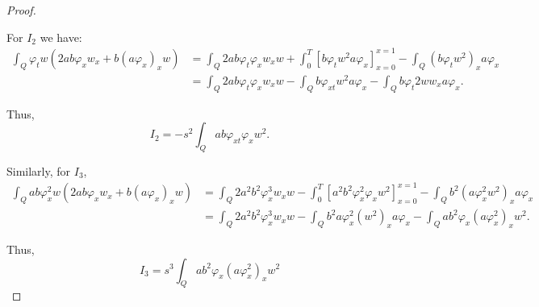 \documentclass[11pt,oneside,a4papper]{osajnl}
\begin{document}
\begin{proof}
$$$$

For $I_2$ we have:
\begin{align*}
	\int_{Q} \varphi_t w \left( 2ab\varphi_x w_x+b(a\varphi_x)_x w  \right)
	&=\int_{Q}2ab\varphi_t\varphi_x w_x w+\int_{0}^{T}\left[b\varphi_t  w^2a\varphi_x\right]^{x=1}_{x=0}-\int_{Q}(b\varphi_t  w^2)_x a\varphi_x\\
    &=\int_{Q}2ab\varphi_t\varphi_x w_x w-\int_{Q}b\varphi_{xt}  w^2 a\varphi_x-\int_{Q}b\varphi_{t}  2w w_x a\varphi_x.
\end{align*}

Thus, 
$$I_2=-s^2\int_{Q} ab\varphi_{xt}\varphi_x  w^2.$$

Similarly, for $I_3$,
\begin{align*}
    \int_{Q}  ab\varphi_x^2w\left( 2ab\varphi_x w_x+b(a\varphi_x)_x w  \right) &=
    \int_{Q} 2a^2b^2\varphi_x^3w_x w-\int_{0}^{T}\left[a^2b^2\varphi_x^2\varphi_x w^2\right]^{x=1}_{x=0}
	-\int_{Q} b^2 (a\varphi_x^2  w^2)_x a\varphi_x \\
    &=\int_{Q} 2a^2b^2\varphi_x^3w_x w-\int_{Q} b^2 a\varphi_x^2(  w^2)_x a\varphi_x-\int_{Q} ab^2\varphi_x (a\varphi_x^2)_x  w^2.
\end{align*}

Thus,
$$I_3=s^3\int_{Q} ab^2\varphi_x (a\varphi_x^2)_x  w^2$$


\end{proof}
\end{document}
